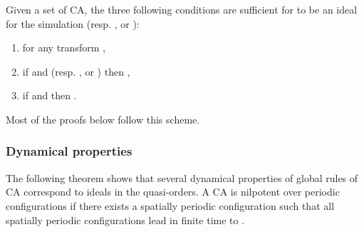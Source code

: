 \documentclass[a4paper]{elsarticle}
\begin{document}
Given a set  of CA, the three following conditions are sufficient for
 to be an ideal for the simulation  (resp. , or
):
\begin{enumerate}
\item  for any transform ,
\item if  and  (resp. ,
  or ) then ,
\item if  and  then .
\end{enumerate}

Most of the proofs below follow this scheme.  

\subsubsection{Dynamical properties}

The following theorem shows that several dynamical properties of
global rules of CA correspond to ideals in the quasi-orders.  A CA is
nilpotent over periodic configurations if there exists a spatially
periodic configuration  such that all spatially periodic
configurations lead in finite time to .
\end{document}
